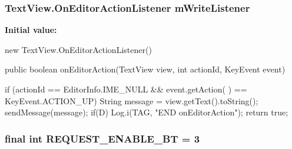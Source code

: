 \hypertarget{classcom_1_1example_1_1android_1_1_bluetooth_chat_1_1_l_a_s_a_r_control_ac5c84f8a3ba36418f2fbaa4889f2bcdf}{
\subsubsection[{m\-Write\-Listener}]{\setlength{\rightskip}{0pt plus 5cm}Text\-View.\-On\-Editor\-Action\-Listener {\bf m\-Write\-Listener}}}\label{classcom_1_1example_1_1android_1_1_bluetooth_chat_1_1_l_a_s_a_r_control_ac5c84f8a3ba36418f2fbaa4889f2bcdf}
{\bfseries Initial value\-:}
\begin{DoxyCode}

                        new TextView.OnEditorActionListener() {
                public boolean onEditorAction(TextView view, int actionId, 
      KeyEvent event) {
                        
                        if (actionId == EditorInfo.IME_NULL && event.getAction(
      ) == KeyEvent.ACTION_UP) {
                                String message = view.getText().toString();
                                sendMessage(message);
                        }
                        if(D) Log.i(TAG, "END onEditorAction");
                        return true;
                }
        }
\end{DoxyCode}
\hypertarget{classcom_1_1example_1_1android_1_1_bluetooth_chat_1_1_l_a_s_a_r_control_a97c8da628747620e0882fcec5b6cee15}{
\subsubsection[{R\-E\-Q\-U\-E\-S\-T\-\_\-\-E\-N\-A\-B\-L\-E\-\_\-\-B\-T}]{\setlength{\rightskip}{0pt plus 5cm}final int {\bf R\-E\-Q\-U\-E\-S\-T\-\_\-\-E\-N\-A\-B\-L\-E\-\_\-\-B\-T} = 3}}\label{classcom_1_1example_1_1android_1_1_bluetooth_chat_1_1_l_a_s_a_r_control_a97c8da628747620e0882fcec5b6cee15}
